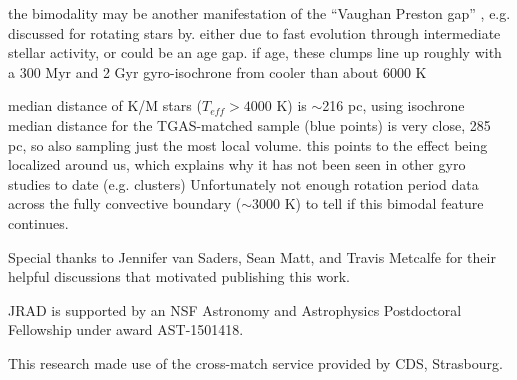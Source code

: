 \documentclass[manuscript, letterpaper]{aastex6}
\begin{document}
the bimodality may be another manifestation of the ``Vaughan Preston gap'' \citep{vaughan1980}, e.g. discussed for rotating stars by\citet{kado-fong2016}.
either due to fast evolution through intermediate stellar activity, or could be an age gap. if age, these clumps line up roughly with a 300 Myr and 2 Gyr \citet{meibom2011} gyro-isochrone from cooler than about 6000 K

median distance of K/M stars ($T_{eff} > 4000$ K) is $\sim$216 pc, using isochrone
median distance for the TGAS-matched sample (blue points) is very close, 285 pc, so also sampling just the most local volume.
this points to the effect being localized around us, which explains why it has not been seen in other gyro studies to date (e.g. clusters)
Unfortunately not enough rotation period data across the fully convective boundary ($\sim$3000 K) to tell if this bimodal feature continues.




\acknowledgments
Special thanks to Jennifer van Saders, Sean Matt, and Travis Metcalfe for their helpful discussions that motivated publishing this work.

JRAD is supported by an NSF Astronomy and Astrophysics Postdoctoral Fellowship under award AST-1501418.

This research made use of the cross-match service provided by CDS, Strasbourg.


\end{document}
